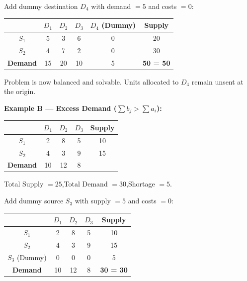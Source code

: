 \documentclass[12pt]{article}
\begin{document}
Add dummy destination $D_4$ with demand $= 5$ and costs $= 0$:

\begin{center}
\renewcommand{\arraystretch}{1.3}
\begin{tabular}{|c|c|c|c|c|c|}
  \hline
  \rowcolor{primary}
  {\color{white}} & {\color{white}$D_1$} & {\color{white}$D_2$} & {\color{white}$D_3$} &
  {\color{white}$D_4$ (Dummy)} & {\color{white}Supply} \\
  \hline
  \rowcolor{lightbg!50} $S_1$ & 5 & 3 & 6 & 0 & 20 \\
  \hline
  $S_2$ & 4 & 7 & 2 & 0 & 30 \\
  \hline
  \rowcolor{accent!20}\textbf{Demand} & 15 & 20 & 10 & 5 & \textbf{50 = 50} \\
  \hline
\end{tabular}
\end{center}

Problem is now balanced and solvable. Units allocated to $D_4$ remain unsent at the origin.

\vspace{10pt}

\textbf{Example B --- Excess Demand ($\sum b_j > \sum a_i$):}

\begin{center}
\renewcommand{\arraystretch}{1.3}
\begin{tabular}{|c|c|c|c|c|}
  \hline
  \rowcolor{primary}
  {\color{white}} & {\color{white}$D_1$} & {\color{white}$D_2$} & {\color{white}$D_3$} & {\color{white}Supply} \\
  \hline
  \rowcolor{lightbg!50} $S_1$ & 2 & 8 & 5 & 10 \\
  \hline
  $S_2$ & 4 & 3 & 9 & 15 \\
  \hline
  \rowcolor{accent!20}\textbf{Demand} & 10 & 12 & 8 & \\
  \hline
\end{tabular}
\end{center}

Total Supply $= 25$,\quad Total Demand $= 30$,\quad Shortage $= 5$.

Add dummy source $S_3$ with supply $= 5$ and costs $= 0$:

\begin{center}
\renewcommand{\arraystretch}{1.3}
\begin{tabular}{|c|c|c|c|c|}
  \hline
  \rowcolor{primary}
  {\color{white}} & {\color{white}$D_1$} & {\color{white}$D_2$} & {\color{white}$D_3$} & {\color{white}Supply} \\
  \hline
  \rowcolor{lightbg!50} $S_1$ & 2 & 8 & 5 & 10 \\
  \hline
  $S_2$ & 4 & 3 & 9 & 15 \\
  \hline
  \rowcolor{lightbg!50} $S_3$ (Dummy) & 0 & 0 & 0 & 5 \\
  \hline
  \rowcolor{accent!20}\textbf{Demand} & 10 & 12 & 8 & \textbf{30 = 30} \\
  \hline
\end{tabular}
\end{center}
\end{document}

